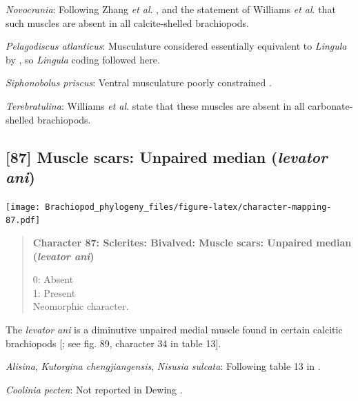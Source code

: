 \documentclass[openany]{book}
\begin{document}
\hypertarget{Novocrania-coding-86}{}
\emph{Novocrania}: Following Zhang \emph{et al}.
\citeyearpar{Zhang2014Anearly}, and the statement of Williams \emph{et
al}. \citeyearpar{Williams2000LinguliformeaCraniiformea} that such
muscles are absent in all calcite-shelled brachiopods.

\hypertarget{Pelagodiscus_atlanticus-coding-86}{}
\emph{Pelagodiscus atlanticus}: Musculature considered essentially
equivalent to \emph{Lingula} by
\citet{Williams2000LinguliformeaCraniiformea}, so \emph{Lingula} coding
followed here.

\hypertarget{Siphonobolus_priscus-coding-86}{}
\emph{Siphonobolus priscus}: Ventral musculature poorly constrained
\citep{Williams2000LinguliformeaCraniiformea, Popov2009Earlyontogeny}.

\hypertarget{Terebratulina-coding-86}{}
\emph{Terebratulina}: Williams \emph{et al}.
\citeyearpar[p.~32]{Williams2000LinguliformeaCraniiformea} state that
these muscles are absent in all carbonate-shelled brachiopods.

\subsection*{\texorpdfstring{{[}87{]} Muscle scars: Unpaired median
(\emph{levator
ani})}{{[}87{]} Muscle scars: Unpaired median (levator ani)}}\label{muscle-scars-unpaired-median-levator-ani}

\texttt{[image: Brachiopod\_phylogeny\_files/figure-latex/character-mapping-87.pdf]}

\begin{quote}
\textbf{Character 87: Sclerites: Bivalved: Muscle scars: Unpaired median
(\emph{levator ani})}

0: Absent\\
1: Present\\
Neomorphic character.
\end{quote}

The \emph{levator ani} is a diminutive unpaired medial muscle found in
certain calcitic brachiopods
{[}\citet{Williams2000LinguliformeaCraniiformea}; see fig. 89, character
34 in table 13{]}.

\hypertarget{Alisina-coding-87}{}
\emph{Alisina}, \emph{Kutorgina chengjiangensis}, \emph{Nisusia
sulcata}: Following table 13 in
\citet{Williams2000LinguliformeaCraniiformea}.

\hypertarget{Coolinia_pecten-coding-87}{}
\emph{Coolinia pecten}: Not reported in Dewing
\citeyearpar{Dewing2001Hingemodifications}.
\end{document}
